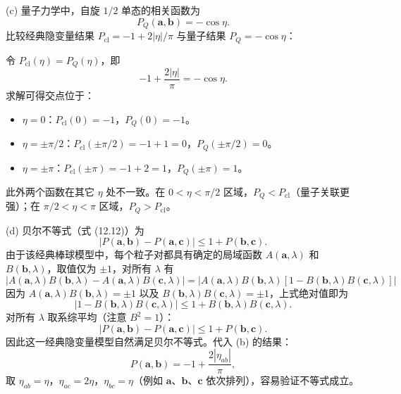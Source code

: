 \begin{solution}
(c) 量子力学中，自旋 $1/2$ 单态的相关函数为
\[
\boxed{P_Q(\mathbf a,\mathbf b) = -\cos\eta.}
\]
比较经典隐变量结果 $P_{\text{cl}} = -1+2|\eta|/\pi$ 与量子结果 $P_Q = -\cos\eta$：

令 $P_{\text{cl}}(\eta)=P_Q(\eta)$，即
\[
-1+\frac{2|\eta|}{\pi} = -\cos\eta.
\]
求解可得交点位于：
\begin{itemize}
\item $\eta=0$：$P_{\text{cl}}(0) = -1$，$P_Q(0) = -1$。
\item $\eta=\pm\pi/2$：$P_{\text{cl}}(\pm\pi/2) = -1+1 = 0$，$P_Q(\pm\pi/2) = 0$。
\item $\eta=\pm\pi$：$P_{\text{cl}}(\pm\pi) = -1+2 = 1$，$P_Q(\pm\pi) = 1$。
\end{itemize}
此外两个函数在其它 $\eta$ 处不一致。在 $0<\eta<\pi/2$ 区域，$P_Q < P_{\text{cl}}$（量子关联更强）；在 $\pi/2<\eta<\pi$ 区域，$P_Q > P_{\text{cl}}$。

(d) 贝尔不等式（式 (12.12)）为
\[
|P(\mathbf a,\mathbf b)-P(\mathbf a,\mathbf c)| \le 1+P(\mathbf b,\mathbf c).
\]
由于该经典棒球模型中，每个粒子对都具有确定的局域函数 $A(\mathbf a,\lambda)$ 和 $B(\mathbf b,\lambda)$，取值仅为 $\pm1$，对所有 $\lambda$ 有
\[
|A(\mathbf a,\lambda)B(\mathbf b,\lambda)-A(\mathbf a,\lambda)B(\mathbf c,\lambda)| = |A(\mathbf a,\lambda)B(\mathbf b,\lambda)[1-B(\mathbf b,\lambda)B(\mathbf c,\lambda)]|
\]
因为 $A(\mathbf a,\lambda)B(\mathbf b,\lambda)=\pm1$ 以及 $B(\mathbf b,\lambda)B(\mathbf c,\lambda)=\pm1$，上式绝对值即为
\[
|1-B(\mathbf b,\lambda)B(\mathbf c,\lambda)| \le 1+B(\mathbf b,\lambda)B(\mathbf c,\lambda).
\]
对所有 $\lambda$ 取系综平均（注意 $B^2=1$）：
\[
|P(\mathbf a,\mathbf b)-P(\mathbf a,\mathbf c)| \le 1+P(\mathbf b,\mathbf c).
\]
因此这一经典隐变量模型自然满足贝尔不等式。代入 (b) 的结果：
\[
P(\mathbf a,\mathbf b) = -1+\frac{2|\eta_{ab}|}{\pi},
\]
取 $\eta_{ab}=\eta$，$\eta_{ac}=2\eta$，$\eta_{bc}=\eta$（例如 $\mathbf a$、$\mathbf b$、$\mathbf c$ 依次排列），容易验证不等式成立。
\end{solution}

